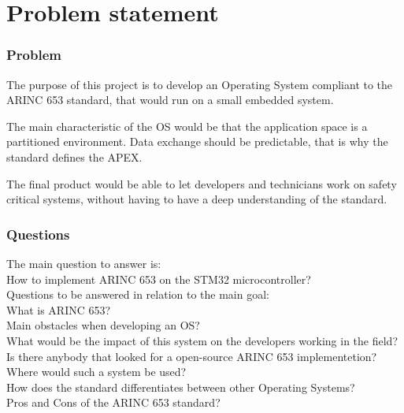 \chapter{Problem statement}

\subsection{Problem}

The purpose of this project is to develop an Operating System compliant to the ARINC 653 standard, that would run on a small embedded system. 

The main characteristic of the OS would be that the application space is a partitioned environment.
Data exchange should be predictable, that is why the standard defines the APEX.

The final product would be able to let developers and technicians work on safety critical systems,
 without having to have a deep understanding of the standard.

\subsection{Questions}

The main question to answer is:\\
How to implement ARINC 653 on the STM32 microcontroller?\\

Questions to be answered in relation to the main goal:\\
What is ARINC 653?\\
Main obstacles when developing an OS?\\
What would be the impact of this system on the developers working in the field?\\
Is there anybody that looked for a open-source ARINC 653 implementetion?\\
Where would such a system be used?\\
How does the standard differentiates between other Operating Systems?\\
Pros and Cons of the ARINC 653 standard?\\